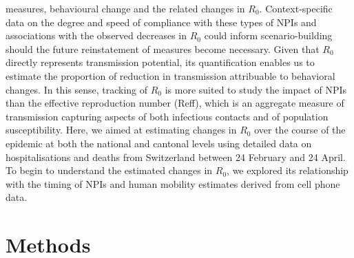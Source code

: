 measures, behavioural change and the related changes in $R_0$. Context-specific data on the degree and speed of compliance with these types of NPIs and associations with the observed decreases in $R_0$ could inform scenario-building should the future reinstatement of measures become necessary. Given that $R_0$ directly represents transmission potential, its quantification enables us to estimate the proportion of reduction in transmission attribuable to behavioral changes. In this sense, tracking of $R_0$ is more suited to study the impact of NPIs than the effective reproduction number (Reff), which is an aggregate measure of transmission capturing aspects of both infectious contacts and of population susceptibility. 
Here, we aimed at estimating changes in $R_0$ over the course of the epidemic at both the national and cantonal levels using detailed data on hospitalisations and deaths from Switzerland between 24 February and 24 April. To begin to understand the estimated changes in $R_0$, we explored its relationship with the timing of NPIs and human mobility estimates derived from cell phone data.

\section{Methods}
